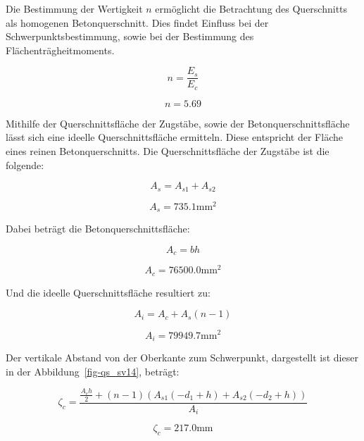 \documentclass[
  12pt,
  letterpaper,
  egregdoesnotlikesansseriftitles]{scrreprt}
\begin{document}
Die Bestimmung der Wertigkeit \(n\) ermöglicht die Betrachtung des
Querschnitts als homogenen Betonquerschnitt. Dies findet Einfluss bei
der Schwerpunktsbestimmung, sowie bei der Bestimmung des
Flächenträgheitmoments.

\begin{equation}n = \frac{E_{s}}{E_{c}}\end{equation}

\begin{equation}n = 5.69\end{equation}

Mithilfe der Querschnittsfläche der Zugstäbe, sowie der
Betonquerschnittsfläche lässt sich eine ideelle Querschnittsfläche
ermitteln. Diese entspricht der Fläche eines reinen Betonquerschnitts.
Die Querschnittsfläche der Zugstäbe ist die folgende:

\begin{equation}A_{s} = A_{s 1} + A_{s 2}\end{equation}

\begin{equation}A_{s} = 735.1 \text{mm}^{2}\end{equation}

Dabei beträgt die Betonquerschnittsfläche:

\begin{equation}A_{c} = b h\end{equation}

\begin{equation}A_{c} = 76500.0 \text{mm}^{2}\end{equation}

Und die ideelle Querschnittsfläche resultiert zu:

\begin{equation}A_{i} = A_{c} + A_{s} \left(n - 1\right)\end{equation}

\begin{equation}A_{i} = 79949.7 \text{mm}^{2}\end{equation}

Der vertikale Abstand von der Oberkante zum Schwerpunkt, dargestellt ist
dieser in der Abbildung~\ref{fig-qs_sv14}, beträgt:

\begin{equation}\zeta_{c} = \frac{\frac{A_{c} h}{2} + \left(n - 1\right) \left(A_{s 1} \left(- d_{1} + h\right) + A_{s 2} \left(- d_{2} + h\right)\right)}{A_{i}}\end{equation}

\begin{equation}\zeta_{c} = 217.0 \text{mm}\end{equation}
\end{document}
